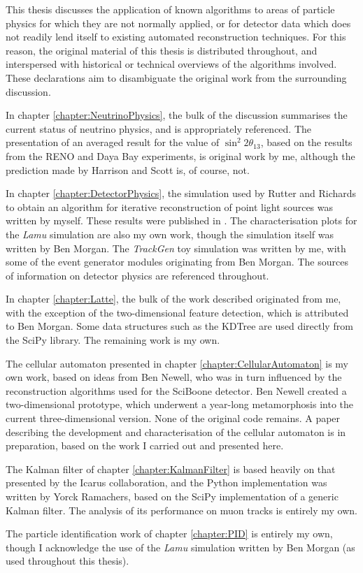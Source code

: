 This thesis discusses the application of known algorithms to areas of particle physics for which they are not normally applied, or for detector data which does not readily lend itself to existing automated reconstruction techniques. For this reason, the original material of this thesis is distributed throughout, and interspersed with historical or technical overviews of the algorithms involved. These declarations aim to disambiguate the original work from the surrounding discussion.

In chapter \ref{chapter:NeutrinoPhysics}, the bulk of the discussion summarises the current status of neutrino physics, and is appropriately referenced. The presentation of an averaged result for the value of $\sin^2 2\theta_{13}$, based on the results from the RENO and Daya Bay experiments, is original work by me, although the prediction made by Harrison and Scott is, of course, not.

In chapter \ref{chapter:DetectorPhysics}, the simulation used by Rutter and Richards to obtain an algorithm for iterative reconstruction of point light sources was written by myself. These results were published in \citep{Rutter2011}. The characterisation plots for the \emph{Lamu} simulation are also my own work, though the simulation itself was written by Ben Morgan. The \emph{TrackGen} toy simulation was written by me, with some of the event generator modules originating from Ben Morgan. The sources of information on detector physics are referenced throughout.

In chapter \ref{chapter:Latte}, the bulk of the work described originated from me, with the exception of the two-dimensional feature detection, which is attributed to Ben Morgan. Some data structures such as the KDTree are used directly from the SciPy library. The remaining work is my own.

The cellular automaton presented in chapter \ref{chapter:CellularAutomaton} is my own work, based on ideas from Ben Newell, who was in turn influenced by the reconstruction algorithms used for the SciBoone detector. Ben Newell created a two-dimensional prototype, which underwent a year-long metamorphosis into the current three-dimensional version. None of the original code remains. A paper describing the development and characterisation of the cellular automaton is in preparation, based on the work I carried out and presented here.

The Kalman filter of chapter \ref{chapter:KalmanFilter} is based heavily on that presented by the Icarus collaboration, and the Python implementation was written by Yorck Ramachers, based on the SciPy implementation of a generic Kalman filter. The analysis of its performance on muon tracks is entirely my own.

The particle identification work of chapter \ref{chapter:PID} is entirely my own, though I acknowledge the use of the \emph{Lamu} simulation written by Ben Morgan (as used throughout this thesis).
